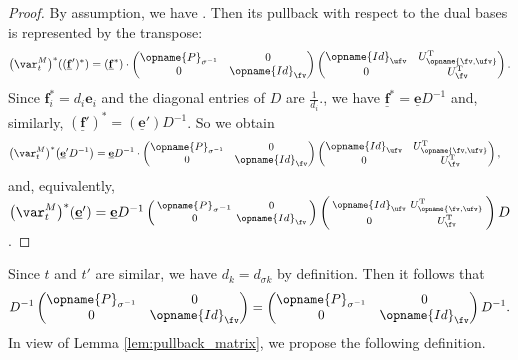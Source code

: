 \documentclass[pdftex]{sigma}
\newcommand{\Id}{{\opname{Id}}}
\newcommand{\trans}{\opname{P}}
\newcommand{\ee}{\mathbf{e}}
\newcommand{\ff}{\mathbf{f}}
\newcommand{\uee}{\underline{\ee}}
\newcommand{\uff}{\underline{\ff}}
\newcommand{\low}{\opname{\fv,\ufv}}
\numberwithin{equation}{section}
\begin{document}
\begin{proof}

By assumption, we have \smash{$\var_{t}^{M}(\uff)=\uff'\cdot\left(\begin{smallmatrix}
\Id_{\ufv} & 0\\
U_{\low} & U_{\fv}
\end{smallmatrix}\right)\left(\begin{smallmatrix}
\trans_{\sigma} & 0\\
0 & \Id_{\fv}
\end{smallmatrix}\right)$}. Then its pullback with respect to the dual bases is represented
by the transpose:
\begin{gather*}
\bigl(\var_{t}^{M}\bigr)^{*}((\uff')^{*}) = (\uff^{*})\cdot\begin{pmatrix}
\trans_{\sigma^{-1}} & 0\\
0 & \Id_{\fv}
\end{pmatrix}\begin{pmatrix}
\Id_{\ufv} & U_{\low}^{\rm T}\\
0 & U_{\fv}^{\rm T}
\end{pmatrix}.
\end{gather*}
Since $\ff_{i}^{*}=d_{i}\ee_{i}$ and the diagonal entries of $D$
are $\frac{1}{d_{i}}$., we have $\uff^{*}=\uee D^{-1}$ and, similarly,
$(\uff')^{*}=(\uee')D^{-1}$. So we obtain
\begin{align*}
\bigl(\var_{t}^{M}\bigr)^{*}\bigl(\uee'D^{-1}\bigr) & =\uee D^{-1}\cdot\begin{pmatrix}
\trans_{\sigma^{-1}} & 0\\
0 & \Id_{\fv}
\end{pmatrix}\begin{pmatrix}
\Id_{\ufv} & U_{\low}^{\rm T}\\
0 & U_{\fv}^{\rm T}
\end{pmatrix},
\end{align*}
and, equivalently, $\bigl(\var_{t}^{M}\bigr)^{*}(\uee')=\uee D^{-1}\left(\begin{smallmatrix}
\trans_{\sigma^{-1}} & 0\\
0 & \Id_{\fv}
\end{smallmatrix}\right)\left(\begin{smallmatrix}
\Id_{\ufv} & U_{\low}^{\rm T}\\
0 & U_{\fv}^{\rm T}
\end{smallmatrix}\right)D$.
\end{proof}

Since $t$ and $t'$ are similar, we have $d_{k}=d_{\sigma k}$ by
definition. Then it follows that \[D^{-1}\begin{pmatrix}
\trans_{\sigma^{-1}} & 0\\
0 & \Id_{\fv}
\end{pmatrix}=\begin{pmatrix}
\trans_{\sigma^{-1}} & 0\\
0 & \Id_{\fv}
\end{pmatrix}D^{-1}.\] In view of Lemma \ref{lem:pullback_matrix}, we propose the following
definition.
\end{document}
